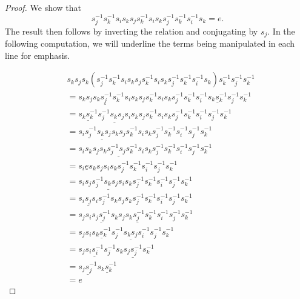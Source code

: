 \documentclass[11pt]{amsart}
\theoremstyle{definition}
\begin{document}
\begin{proof}
We show that
$$s_{j}^{-1}s_{k}^{-1}s_{i}s_{k}s_{j}s_{k}^{-1}s_{i}s_{k}s_{j}^{-1}s_{k}^{-1}s_{i}^{-1}s_{k} = e.$$
The result then follows by inverting the relation and conjugating by $s_{j}$. In the following computation, we will underline the terms being manipulated in each line for emphasis.

\begin{align*}
& s_{k}s_{j}s_{k}(s_{j}^{-1}s_{k}^{-1}s_{i}s_{k}s_{j}s_{k}^{-1}s_{i}s_{k}s_{j}^{-1}s_{k}^{-1}s_{i}^{-1}s_{k})s_{k}^{-1}s_{j}^{-1}s_{k}^{-1} \\
&= s_{k}\underline{s_{j}s_{k}s_{j}^{-1}s_{k}^{-1}}s_{i}s_{k}s_{j}s_{k}^{-1}s_{i}s_{k}s_{j}^{-1}s_{k}^{-1}s_{i}^{-1}\underline{s_{k}s_{k}^{-1}}s_{j}^{-1}s_{k}^{-1} \\
&= \underline{s_{k}s_{k}^{-1}}\underline{s_{j}^{-1}s_{k}s_{j}s_{i}}s_{k}s_{j}s_{k}^{-1}s_{i}s_{k}s_{j}^{-1}s_{k}^{-1}s_{i}^{-1}s_{j}^{-1}s_{k}^{-1} \\
&= s_{i}\underline{s_{j}^{-1}s_{k}s_{j}s_{k}}s_{j}s_{k}^{-1}s_{i}s_{k}s_{j}^{-1}s_{k}^{-1}s_{i}^{-1}s_{j}^{-1}s_{k}^{-1} \\
&= s_{i}s_{k}s_{j}\underline{s_{k}s_{j}^{-1}s_{j}s_{k}^{-1}}s_{i}s_{k}s_{j}^{-1}s_{k}^{-1}s_{i}^{-1}s_{j}^{-1}s_{k}^{-1} \\
&= s_{i}\underline{e}s_{k}s_{j}s_{i}s_{k}s_{j}^{-1}s_{k}^{-1}s_{i}^{-1}s_{j}^{-1}s_{k}^{-1} \\
&= s_{i}s_{j}\underline{s_{j}^{-1}s_{k}s_{j}s_{i}}s_{k}s_{j}^{-1}s_{k}^{-1}s_{i}^{-1}s_{j}^{-1}s_{k}^{-1} \\
&= \underline{s_{i}s_{j}s_{i}}s_{j}^{-1}s_{k}s_{j}s_{k}s_{j}^{-1}s_{k}^{-1}s_{i}^{-1}s_{j}^{-1}s_{k}^{-1} \\
&= s_{j}s_{i}\underline{s_{j}s_{j}^{-1}}s_{k}\underline{s_{j}s_{k}s_{j}^{-1}s_{k}^{-1}}s_{i}^{-1}s_{j}^{-1}s_{k}^{-1} \\
&= s_{j}s_{i}\underline{s_{k}s_{k}^{-1}}\underline{s_{j}^{-1}s_{k}s_{j}s_{i}^{-1}}s_{j}^{-1}s_{k}^{-1} \\
&= s_{j}\underline{s_{i}s_{i}^{-1}}s_{j}^{-1}s_{k}\underline{s_{j}s_{j}^{-1}}s_{k}^{-1} \\
&= \underline{s_{j}s_{j}^{-1}}\underline{s_{k}s_{k}^{-1}} \\
&= e
\end{align*}
\end{proof}
\end{document}
